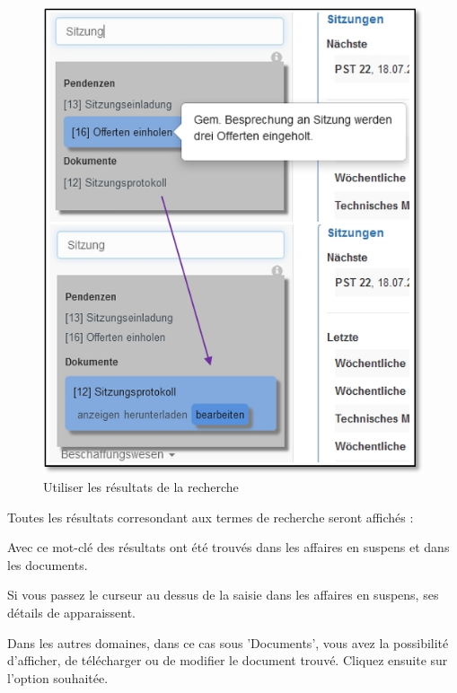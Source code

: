 \begin{figure}   %
  \vspace{-30pt}      %
  \begin{center}
    \includegraphics[width=0.8\linewidth]{../chapters/02_GettingStarted/pictures/2-5-1_Such_Ergebnisse.jpg}
  \end{center}
  \vspace{-20pt}
  \caption{Utiliser les résultats de la recherche}
  \vspace{-10pt}
\end{figure}

Toutes les résultats corresondant aux termes de recherche seront affichés :

\begin{compactitem}
	\item Avec ce mot-clé des résultats ont été trouvés dans les affaires en suspens et dans les documents.
	\item Si vous passez le curseur au dessus de la saisie dans les affaires en suspens, ses détails de apparaissent.
	\item Dans les autres domaines, dans ce cas sous 'Documents', vous avez la possibilité d'afficher, de télécharger ou de modifier le document trouvé. Cliquez ensuite sur l'option souhaitée.
\end{compactitem}


